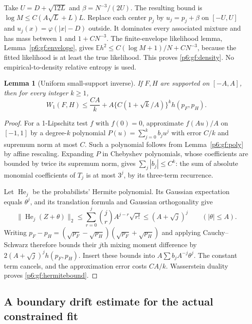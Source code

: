 \documentclass[11pt,a4paper]{article}
\newtheorem{lemma}[theorem]{Lemma}
\theoremstyle{definition}
\theoremstyle{remark}
\numberwithin{equation}{section}
\begin{document}
Take $U=D+\sqrt{12L}$ and $\beta=N^{-3}/(2U)$.
The resulting bound is $\log M\le C(A\sqrt L+L)L$.
Replace each center $p_j$ by $u_j=p_j+\beta$ on $[-U,U]$ and
$u_j(x)=\varphi(|x|-D)$ outside.  It dominates every associated
mixture and has mass between $1$ and $1+CN^{-3}$.
The finite-envelope likelihood lemma, Lemma~\ref{p6:gf:envelope}, gives
$\mathbb E h^2\le C(\log M+1)/N+CN^{-3}$, because the fitted
likelihood is at least the true likelihood.  This proves
\eqref{p6:gf:density}.  No empirical-to-density relative entropy is used.

\begin{lemma}[Uniform small-support inverse]\label{p6:gf:hermite}
If $F,H$ are supported on $[-A,A]$, then for every integer $k\ge1$,
\begin{equation}\label{p6:gf:hermitebound}
 W_1(F,H)\le \frac{CA}{k}
       +A\{C(1+\sqrt k/A)\}^{k}h(p_F,p_H).
\end{equation}
\end{lemma}
\begin{proof}
For a 1-Lipschitz test $f$ with $f(0)=0$, approximate $f(Au)/A$
on $[-1,1]$ by a degree-$k$ polynomial $P(u)=\sum_{j=0}^k b_ju^j$
with error $C/k$ and supremum norm at most $C$.
Such a polynomial follows from Lemma~\ref{p6:gf:poly} by affine
rescaling.  Expanding $P$ in Chebyshev polynomials, whose coefficients
are bounded by twice its supremum norm, gives
$\sum_j|b_j|\le C^k$: the sum of absolute monomial coefficients
of $T_j$ is at most $3^j$, by its three-term recurrence.

Let $\operatorname{He}_j$ be the probabilists' Hermite polynomial.
Its Gaussian expectation equals $\theta^j$, and its translation
formula and Gaussian orthogonality give
\[
 \|\operatorname{He}_j(Z+\theta)\|_2
 \le\sum_{r=0}^j\binom jr A^{j-r}\sqrt{r!}
 \le(A+\sqrt j)^j\qquad(|\theta|\le A).
\]
Writing $p_F-p_H=(\sqrt{p_F}-\sqrt{p_H})(\sqrt{p_F}+\sqrt{p_H})$
and applying Cauchy--Schwarz therefore bounds their $j$th mixing
moment difference by $2(A+\sqrt j)^j h(p_F,p_H)$.
Insert these bounds into $A\sum b_jA^{-j}\theta^j$.
The constant term cancels, and the approximation error costs $CA/k$.
Wasserstein duality proves \eqref{p6:gf:hermitebound}.
\end{proof}

\subsection{A boundary drift estimate for the actual constrained fit}
\end{document}
